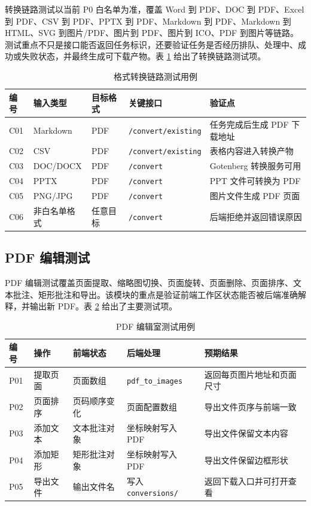转换链路测试以当前 P0 白名单为准，覆盖 Word 到 PDF、DOC 到 PDF、Excel 到 PDF、CSV 到 PDF、PPTX 到 PDF、Markdown 到 PDF、Markdown 到 HTML、SVG 到图片/PDF、图片到 PDF、图片到 ICO、PDF 到图片等链路。测试重点不只是接口能否返回任务标识，还要验证任务是否经历排队、处理中、成功或失败状态，并最终生成可下载产物。表 \ref{tab:chap06-conversion-tests} 给出了转换链路测试项。

\begin{table}[H]
  \centering
  \caption{格式转换链路测试用例}
  \label{tab:chap06-conversion-tests}
  \begin{tabularx}{\textwidth}{llllX}
    \toprule
    编号 & 输入类型 & 目标格式 & 关键接口 & 验证点 \\
    \midrule
    C01 & Markdown & PDF & \texttt{/convert/existing} & 任务完成后生成 PDF 下载地址 \\
    C02 & CSV & PDF & \texttt{/convert/existing} & 表格内容进入转换产物 \\
    C03 & DOC/DOCX & PDF & \texttt{/convert} & Gotenberg 转换服务可用 \\
    C04 & PPTX & PDF & \texttt{/convert} & PPT 文件可转换为 PDF \\
    C05 & PNG/JPG & PDF & \texttt{/convert} & 图片文件生成 PDF 页面 \\
    C06 & 非白名单格式 & 任意目标 & \texttt{/convert} & 后端拒绝并返回错误原因 \\
    \bottomrule
  \end{tabularx}
\end{table}

\subsection{PDF 编辑测试}

PDF 编辑测试覆盖页面提取、缩略图切换、页面旋转、页面删除、页面排序、文本批注、矩形批注和导出。该模块的重点是验证前端工作区状态能否被后端准确解释，并输出新 PDF。表 \ref{tab:chap06-pdf-tests} 给出了主要测试项。

\begin{table}[H]
  \centering
  \caption{PDF 编辑室测试用例}
  \label{tab:chap06-pdf-tests}
  \begin{tabularx}{\textwidth}{llllX}
    \toprule
    编号 & 操作 & 前端状态 & 后端处理 & 预期结果 \\
    \midrule
    P01 & 提取页面 & 页面数组 & \texttt{pdf\_to\_images} & 返回每页图片地址和页面尺寸 \\
    P02 & 页面排序 & 页码顺序变化 & 页面配置数组 & 导出文件页序与前端一致 \\
    P03 & 添加文本 & 文本批注对象 & 坐标映射写入 PDF & 导出文件保留文本内容 \\
    P04 & 添加矩形 & 矩形批注对象 & 坐标映射写入 PDF & 导出文件保留边框形状 \\
    P05 & 导出文件 & 输出文件名 & 写入 \texttt{conversions/} & 返回下载入口并可打开查看 \\
    \bottomrule
  \end{tabularx}
\end{table}

